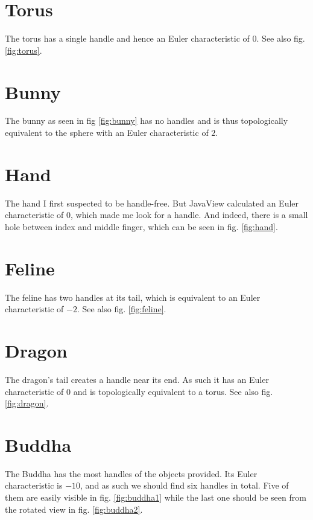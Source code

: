\documentclass[a4paper,10pt,notitlepage]{scrreprt}
\begin{document}
\section{Torus}

The torus has a single handle and hence an Euler characteristic of $0$. See
also fig. \ref{fig:torus}.

\section{Bunny}

The bunny as seen in fig \ref{fig:bunny} has no handles and is thus
topologically equivalent to the sphere with an Euler characteristic of $2$.

\section{Hand}

The hand I first suspected to be handle-free. But JavaView calculated an Euler
characteristic of $0$, which made me look for a handle. And indeed, there is a
small hole between index and middle finger, which can be seen in fig.
\ref{fig:hand}.

\section{Feline}

The feline has two handles at its tail, which is equivalent to an Euler
characteristic of $-2$. See also fig. \ref{fig:feline}.

\section{Dragon}

The dragon's tail creates a handle near its end. As such it has an Euler
characteristic of $0$ and is topologically equivalent to a torus. See also fig.
\ref{fig:dragon}.

\section{Buddha}

The Buddha has the most handles of the objects provided. Its Euler
characteristic is $-10$, and as such we should find six handles in total. Five
of them are easily visible in fig. \ref{fig:buddha1} while the last one should
be seen from the rotated view in fig. \ref{fig:buddha2}.
\end{document}
